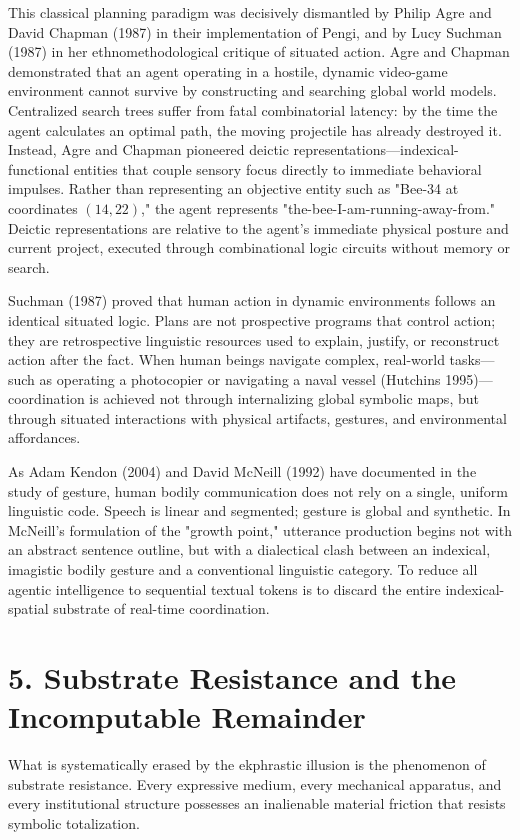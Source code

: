 \documentclass[11pt,twocolumn]{article}
\begin{document}
This classical planning paradigm was decisively dismantled by Philip Agre and David Chapman (1987) in their implementation of Pengi, and by Lucy Suchman (1987) in her ethnomethodological critique of situated action. Agre and Chapman demonstrated that an agent operating in a hostile, dynamic video-game environment cannot survive by constructing and searching global world models. Centralized search trees suffer from fatal combinatorial latency: by the time the agent calculates an optimal path, the moving projectile has already destroyed it. Instead, Agre and Chapman pioneered deictic representations—indexical-functional entities that couple sensory focus directly to immediate behavioral impulses. Rather than representing an objective entity such as "Bee-34 at coordinates $(14, 22)$," the agent represents "the-bee-I-am-running-away-from." Deictic representations are relative to the agent's immediate physical posture and current project, executed through combinational logic circuits without memory or search.

Suchman (1987) proved that human action in dynamic environments follows an identical situated logic. Plans are not prospective programs that control action; they are retrospective linguistic resources used to explain, justify, or reconstruct action after the fact. When human beings navigate complex, real-world tasks—such as operating a photocopier or navigating a naval vessel (Hutchins 1995)—coordination is achieved not through internalizing global symbolic maps, but through situated interactions with physical artifacts, gestures, and environmental affordances. 

As Adam Kendon (2004) and David McNeill (1992) have documented in the study of gesture, human bodily communication does not rely on a single, uniform linguistic code. Speech is linear and segmented; gesture is global and synthetic. In McNeill's formulation of the "growth point," utterance production begins not with an abstract sentence outline, but with a dialectical clash between an indexical, imagistic bodily gesture and a conventional linguistic category. To reduce all agentic intelligence to sequential textual tokens is to discard the entire indexical-spatial substrate of real-time coordination.

\section*{5. Substrate Resistance and the Incomputable Remainder}
What is systematically erased by the ekphrastic illusion is the phenomenon of substrate resistance. Every expressive medium, every mechanical apparatus, and every institutional structure possesses an inalienable material friction that resists symbolic totalization.
\end{document}
